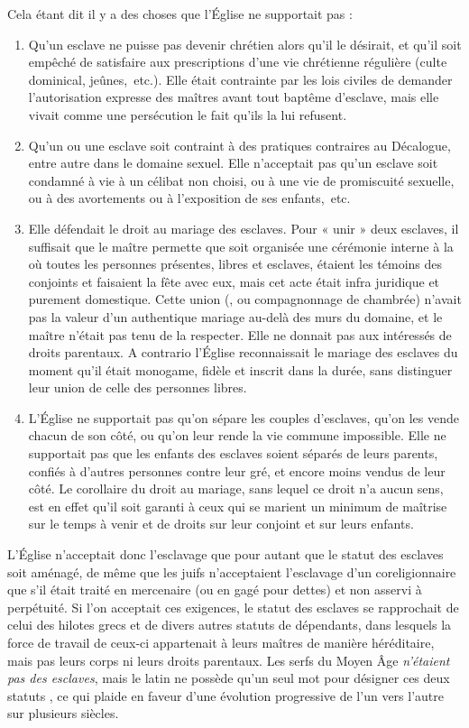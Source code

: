  Cela étant dit il y a des choses que l'Église ne supportait pas :
\begin{enumerate}
\item Qu'un esclave ne puisse pas devenir chrétien alors qu'il le désirait, et qu'il soit empêché de satisfaire aux prescriptions d'une vie chrétienne régulière (culte dominical, jeûnes,~etc.). Elle était contrainte par les lois civiles de demander l'autorisation expresse des maîtres avant tout baptême d'esclave, mais elle vivait comme une persécution le fait qu'ils la lui refusent.
\item Qu'un ou une esclave soit contraint à des pratiques contraires au Décalogue, entre autre dans le domaine sexuel. Elle n'acceptait pas qu'un esclave soit condamné à vie à un célibat non choisi, ou à une vie de promiscuité sexuelle, ou à des avortements ou à l'exposition de ses enfants,~etc.
\item Elle défendait le droit au mariage des esclaves. Pour « unir » deux esclaves, il suffisait que le maître permette que soit organisée une cérémonie interne à la  où toutes les personnes présentes, libres et esclaves, étaient les témoins des conjoints et faisaient la fête avec eux, mais cet acte était infra juridique et purement domestique. Cette union (, ou compagnonnage de chambrée) n'avait pas la valeur d'un authentique mariage au-delà des murs du domaine, et le maître n'était pas tenu de la respecter. Elle ne donnait pas aux intéressés de droits parentaux. A contrario l'Église reconnaissait le mariage des esclaves du moment qu'il était monogame, fidèle et inscrit dans la durée, sans distinguer leur union de celle des personnes libres.
\item L'Église ne supportait pas qu'on sépare les couples d'esclaves, qu'on les vende chacun de son côté, ou qu'on leur rende la vie commune impossible. Elle ne supportait pas que les enfants des esclaves soient séparés de leurs parents, confiés à d'autres personnes contre leur gré, et encore moins vendus de leur côté. Le corollaire du droit au mariage, sans lequel ce droit n'a aucun sens, est en effet qu'il soit garanti à ceux qui se marient un minimum de maîtrise sur le temps à venir et de droits sur leur conjoint et sur leurs enfants. 
\end{enumerate}

 L'Église n'acceptait donc l'esclavage que pour autant que le statut des esclaves soit aménagé, de même que les juifs n'acceptaient l'esclavage d'un coreligionnaire que s'il était traité en mercenaire (ou en gagé pour dettes) et non asservi à perpétuité. Si l'on acceptait ces exigences, le statut des esclaves se rapprochait de celui des hilotes grecs et de divers autres statuts de dépendants, dans lesquels la force de travail de ceux-ci appartenait à leurs maîtres de manière héréditaire, mais pas leurs corps ni leurs droits parentaux. Les serfs du Moyen Âge \emph{n'étaient pas des esclaves}, mais le latin ne possède qu'un seul mot pour désigner ces deux statuts , ce qui plaide en faveur d'une évolution progressive de l'un vers l'autre sur plusieurs siècles.

